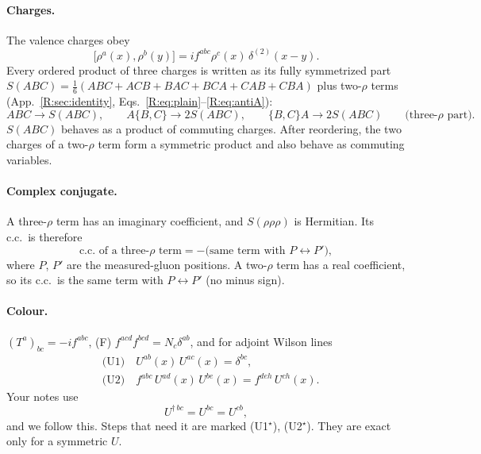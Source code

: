 \documentclass[10pt]{article}
\numberwithin{equation}{section}
\begin{document}
\paragraph{Charges.} The valence charges obey
\begin{equation}
\big[\rho^a(x),\rho^b(y)\big]=if^{abc}\rho^c(x)\,\delta^{(2)}(x-y).
\label{eq:comm}
\end{equation}
Every ordered product of three charges is written as its fully symmetrized part $S(ABC)=\frac16(ABC+ACB+BAC+BCA+CAB+CBA)$ plus two-$\rho$ terms (App.~\ref{R:sec:identity}, Eqs.~\eqref{R:eq:plain}--\eqref{R:eq:antiA}):
\begin{equation}
ABC\to S(ABC),\qquad A\{B,C\}\to2S(ABC),\qquad\{B,C\}A\to2S(ABC)\qquad\text{(three-}\rho\text{ part)}.
\end{equation}
$S(ABC)$ behaves as a product of commuting charges. After reordering, the two charges of a two-$\rho$ term form a symmetric product and also behave as commuting variables.

\paragraph{Complex conjugate.} A three-$\rho$ term has an imaginary coefficient, and $S(\rho\rho\rho)$ is Hermitian. Its c.c.\ is therefore
\begin{equation}
\text{c.c.\ of a three-}\rho\text{ term}=-\big(\text{same term with }P\leftrightarrow P'\big),
\label{eq:cc}
\end{equation}
where $P$, $P'$ are the measured-gluon positions. A two-$\rho$ term has a real coefficient, so its c.c.\ is the same term with $P\leftrightarrow P'$ (no minus sign).

\paragraph{Colour.} $(T^a)_{bc}=-if^{abc}$, (F) $f^{acd}f^{bcd}=N_c\delta^{ab}$, and for adjoint Wilson lines
\begin{align}
&\text{(U1)}\quad U^{ab}(x)\,U^{ac}(x)=\delta^{bc},\label{eq:U1}\\
&\text{(U2)}\quad f^{abc}\,U^{ad}(x)\,U^{be}(x)=f^{deh}\,U^{ch}(x).\label{eq:U2}
\end{align}
Your notes use
\begin{equation}
U^{\dagger\,bc}=U^{bc}=U^{cb},
\label{eq:Usym}
\end{equation}
and we follow this. Steps that need it are marked (U1$^\star$), (U2$^\star$). They are exact only for a symmetric $U$.
\end{document}
